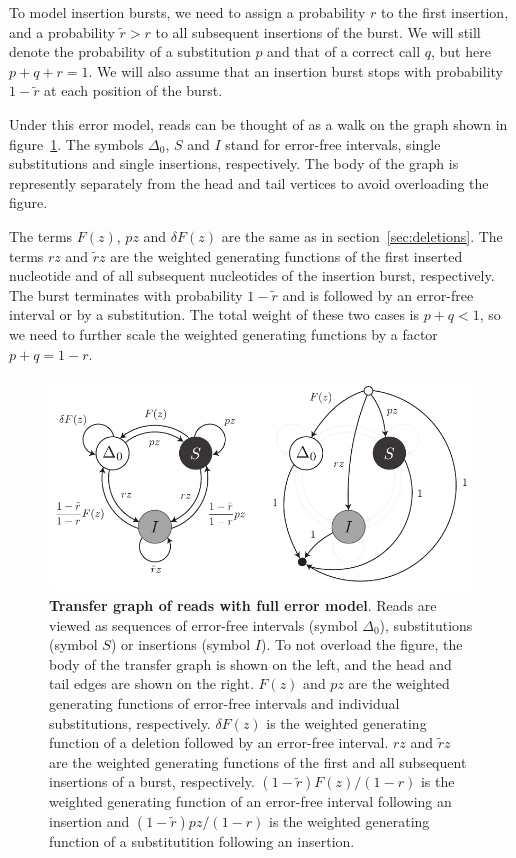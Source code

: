 \documentclass{article}
\begin{document}
To model insertion bursts, we need to assign a probability $r$ to the
first insertion, and a probability $\tilde{r} > r$ to all subsequent
insertions of the burst. We will still denote the probability of a
substitution $p$ and that of a correct call $q$, but here $p+q+r=1$. We
will also assume that an insertion burst stops with probability
$1-\tilde{r}$ at each position of the burst.

Under this error model, reads can be thought of as a walk on the graph
shown in figure~\ref{fig:insertions}. The symbols $\Delta_0$, $S$ and $I$
stand for error-free intervals, single substitutions and single
insertions, respectively. The body of the graph is represently separately
from the head and tail vertices to avoid overloading the figure.

The terms $F(z)$, $pz$ and $\delta F(z)$ are the same as in
section~\ref{sec:deletions}. The terms $rz$ and $\tilde{r}z$ are the
weighted generating functions of the first inserted nucleotide and of all
subsequent nucleotides of the insertion burst, respectively. The burst
terminates with probability $1-\tilde{r}$ and is followed by an error-free
interval or by a substitution. The total weight of these two cases is
$p+q<1$, so we need to further scale the weighted generating functions by
a factor $p+q=1-r$.


\begin{figure}[h]
\centering
\includegraphics[scale=0.9]{insertions.pdf}
\caption{\textbf{Transfer graph of reads with full error model}. Reads are
viewed as sequences of error-free intervals (symbol $\Delta_0$),
substitutions (symbol $S$) or insertions (symbol $I$). To not overload the
figure, the body of the transfer graph is shown on the left, and the head
and tail edges are shown on the right. $F(z)$ and $pz$ are the weighted
generating functions of error-free intervals and individual substitutions,
respectively. $\delta F(z)$ is the weighted generating function of a
deletion followed by an error-free interval. $rz$ and $\tilde{r}z$ are the
weighted generating functions of the first and all subsequent insertions
of a burst, respectively. $(1-\tilde{r})F(z)/(1-r)$ is the weighted
generating function of an error-free interval following an insertion and
$(1-\tilde{r})pz/(1-r)$ is the weighted generating function of a
substitutition following an insertion.}
\label{fig:insertions}
\end{figure}
\end{document}
